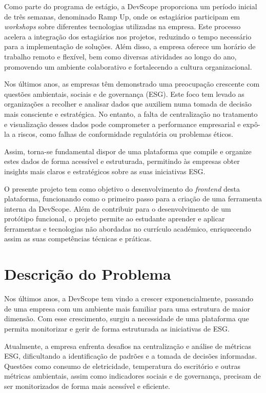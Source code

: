 Como parte do programa de estágio, a DevScope proporciona um período inicial de três semanas, denominado Ramp Up, onde os estagiários participam em \textit{workshops} sobre diferentes tecnologias utilizadas na empresa. Este processo acelera a integração dos estagiários nos projetos, reduzindo o tempo necessário para a implementação de soluções. Além disso, a empresa oferece um horário de trabalho remoto e flexível, bem como diversas atividades ao longo do ano, promovendo um ambiente colaborativo e fortalecendo a cultura organizacional.

Nos últimos anos, as empresas têm demonstrado uma preocupação crescente com questões ambientais, sociais e de governança (ESG). Este foco tem levado as organizações a recolher e analisar dados que auxiliem numa tomada de decisão mais consciente e estratégica. No entanto, a falta de centralização no tratamento e visualização desses dados pode comprometer a performance empresarial e expô-la a riscos, como falhas de conformidade regulatória ou problemas éticos.

Assim, torna-se fundamental dispor de uma plataforma que compile e organize estes dados de forma acessível e estruturada, permitindo às empresas obter insights mais claros e estratégicos sobre as suas iniciativas ESG.

O presente projeto tem como objetivo o desenvolvimento do \textit{frontend} desta plataforma, funcionando como o primeiro passo para a criação de uma ferramenta interna da DevScope. Além de contribuir para o desenvolvimento de um protótipo funcional, o projeto permite ao estudante aprender e aplicar ferramentas e tecnologias não abordadas no currículo académico, enriquecendo assim as suas competências técnicas e práticas.


\section{Descrição do Problema}

Nos últimos anos, a DevScope tem vindo a crescer exponencialmente, passando de uma empresa com um ambiente mais familiar para uma estrutura de maior dimensão. Com esse crescimento, surgiu a necessidade de uma plataforma que permita monitorizar e gerir de forma estruturada as iniciativas de \gls{ESG}.

Atualmente, a empresa enfrenta desafios na centralização e análise de métricas ESG, dificultando a identificação de padrões e a tomada de decisões informadas. Questões como consumo de eletricidade, temperatura do escritório e outras métricas ambientais, assim como indicadores sociais e de governança, precisam de ser monitorizados de forma mais acessível e eficiente.

